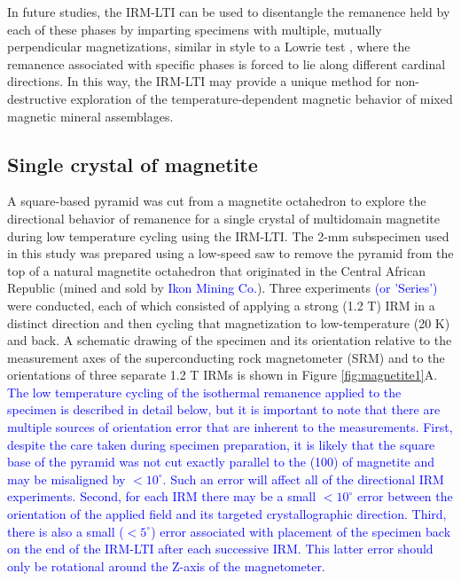 \documentclass[draft,gc]{AGUTeX}
\begin{document}
\begin{article}
In future studies, the IRM-LTI can be used to disentangle the remanence held by each of these phases by imparting specimens with multiple, mutually perpendicular magnetizations, similar in style to a Lowrie test \citep{Lowrie1990a}, where the remanence associated with specific phases is forced to lie along different cardinal directions. In this way, the IRM-LTI may provide a unique method for non-destructive exploration of the temperature-dependent magnetic behavior of mixed magnetic mineral assemblages. 

\subsection{Single crystal of magnetite}

A square-based pyramid was cut from a magnetite octahedron to explore the directional behavior of remanence for a single crystal of multidomain magnetite during low temperature cycling using the IRM-LTI. The 2-mm subspecimen used in this study was prepared using a low-speed saw to remove the pyramid from the top of a natural magnetite octahedron that originated in the Central African Republic (mined and sold by \textcolor{blue}{Ikon Mining Co.}). Three experiments \textcolor{blue}{(or 'Series')} were conducted, each of which consisted of applying a strong (1.2 T) IRM in a distinct direction and then cycling that magnetization to low-temperature (20 K) and back. A schematic drawing of the specimen and its orientation relative to the measurement axes of the superconducting rock magnetometer (SRM) and to the orientations of three separate 1.2 T IRMs is shown in Figure \ref{fig:magnetite1}A. \textcolor{blue}{The low temperature cycling of the isothermal remanence applied to the specimen is described in detail below, but it is important to note that there are multiple sources of orientation error that are inherent to the measurements.  First, despite the care taken during specimen preparation, it is likely that the square base of the pyramid was not cut exactly parallel to the (100) of magnetite and may be misaligned by $<10^{\circ}$. Such an error will affect all of the directional IRM experiments.  Second, for each IRM there may be a small $<10^{\circ}$ error between the orientation of the applied field and its targeted crystallographic direction. Third, there is also a small ($<5^{\circ}$) error associated with placement of the specimen back on the end of the IRM-LTI after each successive IRM. This latter error should only be rotational around the Z-axis of the magnetometer.}  


\end{article}
\end{document}
